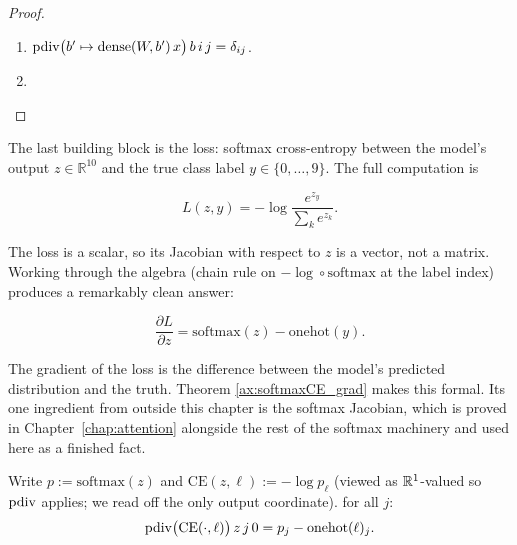 \begin{proof}
\leanok
\begin{enumerate}
  \item \(\operatorname{pdiv}\bigl(b' \mapsto \mathrm{dense}(W, b')\, x\bigr)\, b\, i\, j
          = \delta_{ij}\).
  \item \Qed{}
\end{enumerate}
\end{proof}


The last building block is the loss: softmax cross-entropy between
the model's output \(z \in \mathbb{R}^{10}\) and the true class
label \(y \in \{0, \ldots, 9\}\). The full computation is

\[
L(z, y) = -\log \frac{e^{z_y}}{\sum_k e^{z_k}}.
\]

The loss is a scalar, so its Jacobian with respect to \(z\) is a
vector, not a matrix. Working through the algebra (chain
rule on \(-\log \circ \mathrm{softmax}\) at the label index)
produces a remarkably clean answer:

\[
\frac{\partial L}{\partial z} = \mathrm{softmax}(z) - \mathrm{onehot}(y).
\]

The gradient of the loss is the difference between the model's
predicted distribution and the truth. Theorem
\ref{ax:softmaxCE_grad} makes this formal. Its one ingredient from
outside this chapter is the softmax Jacobian, which is proved in
Chapter~\ref{chap:attention} alongside the rest of the softmax
machinery and used here as a finished fact.

\begin{theorem}
  \label{ax:softmaxCE_grad}
  \leanok
  Write \(p := \mathrm{softmax}(z)\) and
  \(\mathrm{CE}(z, \ell) := -\log p_\ell\) (viewed as
  \(\mathbb{R}^{1}\)-valued so \(\operatorname{pdiv}\) applies; we read off the only
  output coordinate).
  \Prove{} for all \(j\):
  \[
    \operatorname{pdiv}\bigl(\mathrm{CE}(\cdot, \ell)\bigr)\, z\, j\, 0
      = p_j - \mathrm{onehot}(\ell)_j.
  \]
\end{theorem}

